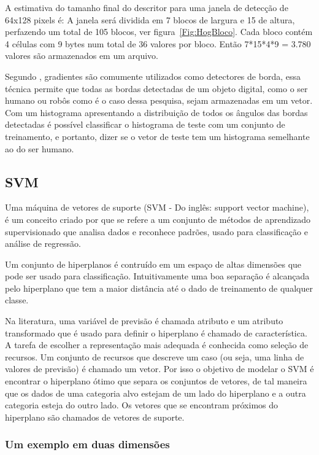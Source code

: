 A estimativa do tamanho final do descritor para uma janela de detecção de 64x128 pixels é:
A janela será dividida em 7 blocos de largura e 15 de altura, perfazendo um total de 105 blocos, ver figura~\ref{Fig:HogBloco}. 
Cada bloco contém 4 células com 9 bytes num total de 36 valores por bloco.  
Então 7*15*4*9 = 3.780 valores são armazenados em um arquivo.

Segundo , gradientes são comumente utilizados como detectores de borda, essa técnica permite que todas as bordas detectadas de um objeto digital, como o ser humano ou robôs como é o caso dessa pesquisa, sejam armazenadas em um vetor. Com um histograma apresentando a distribuição de todos os ângulos das bordas detectadas é possível classificar o histograma de teste com um conjunto de treinamento, e portanto, dizer se o vetor de teste tem um histograma semelhante ao do ser humano.

	\subsection{SVM}

Uma máquina de vetores de suporte (SVM - Do inglês: support vector machine), é um conceito criado por  que se refere a um conjunto de métodos de aprendizado supervisionado que analisa dados e reconhece padrões, usado para classificação e análise de regressão. 

Um conjunto de hiperplanos é contruído em um espaço de altas dimensões que pode ser usado para classificação. Intuitivamente uma boa separação é alcançada pelo hiperplano que tem a maior distância até o dado de treinamento de qualquer classe.

Na literatura, uma variável de previsão é chamada atributo e um atributo transformado que é usado para definir o hiperplano é chamado de característica. A tarefa de escolher a representação mais adequada é conhecida como seleção de recursos. 
Um conjunto de recursos que descreve um caso (ou seja, uma linha de valores de previsão) é chamado um vetor. Por isso o objetivo de modelar o SVM é encontrar o hiperplano ótimo que separa os conjuntos de vetores, de tal maneira que os dados de uma categoria alvo estejam de um lado do hiperplano e a outra categoria esteja do outro lado. Os vetores que se encontram próximos do hiperplano são chamados de vetores de suporte.

		\subsubsection{Um exemplo em duas dimensões}

